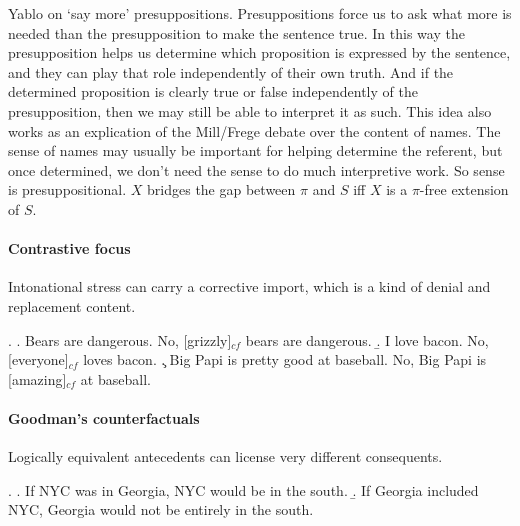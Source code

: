 \documentclass[letterpaper]{article}
\begin{document}
Yablo on `say more' presuppositions.  Presuppositions force us to ask what more is needed than the presupposition to make the sentence true.  In this way the presupposition helps us determine which proposition is expressed by the sentence, and they can play that role independently of their own truth.  And if the determined proposition is clearly true or false independently of the presupposition, then we may still be able to interpret it as such.  This idea also works as an explication of the Mill/Frege debate over the content of names.  The sense of names may usually be important for helping determine the referent, but once determined, we don't need the sense to do much interpretive work.  So sense is presuppositional.  $X$ bridges the gap between $\pi$ and $S$ iff $X$ is a $\pi$-free extension of $S$.

\paragraph{Contrastive focus} Intonational stress can carry a corrective import, which is a kind of denial and replacement content.

\ex. \a. Bears are dangerous.  No, [grizzly]$_{cf}$ bears are dangerous.
\b. I love bacon.  No, [everyone]$_{cf}$ loves bacon.
\c. Big Papi is pretty good at baseball.  No, Big Papi is [amazing]$_{cf}$ at baseball.

\paragraph{Goodman's counterfactuals} Logically equivalent antecedents can license very different consequents.

\ex. \a. If NYC was in Georgia, NYC would be in the south.
\b. If Georgia included NYC, Georgia would not be entirely in the south.
\end{document}
